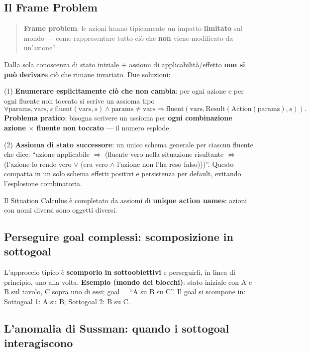 \documentclass[11pt,a4paper]{report}
\begin{document}
\subsection{Il Frame Problem}

\begin{quote}
\textbf{Frame problem}: le azioni hanno tipicamente un impatto \textbf{limitato} sul mondo --- come rappresentare tutto ciò che \textbf{non} viene modificato da un'azione?
\end{quote}

Dalla sola conoscenza di stato iniziale + assiomi di applicabilità/effetto \textbf{non si può derivare} ciò che rimane invariato. Due soluzioni:

(1) \textbf{Enumerare esplicitamente ciò che non cambia}: per ogni azione e per ogni fluente non toccato si scrive un assioma tipo
\[
\forall \text{params},\text{vars},s\; \text{fluent}(\text{vars},s) \wedge \text{params}{\ne}\text{vars} \Rightarrow \text{fluent}(\text{vars}, \text{Result}(\text{Action}(\text{params}),s)).
\]
\textbf{Problema pratico}: bisogna scrivere un assioma per \textbf{ogni combinazione azione $\times$ fluente non toccato} --- il numero esplode.

(2) \textbf{Assioma di stato successore}: un unico schema generale per ciascun fluente che dice: ``azione applicabile $\Rightarrow$ (fluente vero nella situazione risultante $\Leftrightarrow$ (l'azione lo rende vero $\vee$ (era vero $\wedge$ l'azione non l'ha reso falso)))''. Questo compatta in un solo schema effetti positivi e persistenza per default, evitando l'esplosione combinatoria.

Il Situation Calculus è completato da assiomi di \textbf{unique action names}: azioni con nomi diversi sono oggetti diversi.

\subsection{Perseguire goal complessi: scomposizione in sottogoal}

L'approccio tipico è \textbf{scomporlo in sottoobiettivi} e perseguirli, in linea di principio, uno alla volta. \textbf{Esempio (mondo dei blocchi)}: stato iniziale con A e B sul tavolo, C sopra uno di essi; goal = ``A su B su C''. Il goal si scompone in: Sottogoal 1: A su B; Sottogoal 2: B su C.

\subsection{L'anomalia di Sussman: quando i sottogoal interagiscono}
\end{document}
